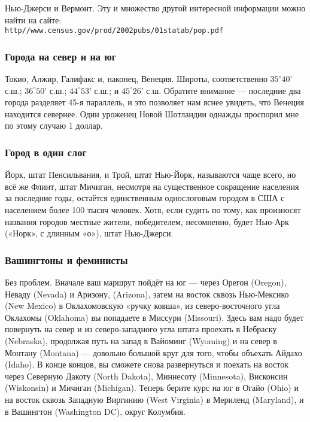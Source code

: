 Нью-Джерси и Вермонт.
Эту и множество другой интересной информации можно найти на сайте:\\
\texttt{http//www.census.gov/prod/2002pubs/01statab/pop.pdf} 
 \heart                          

\subsubsection*{Города на север и на юг}%

Токио, Алжир, Галифакс и, наконец, Венеция.
Широты, соответственно
$35^\circ 40’$ с.ш.; $36^\circ 50’$ с.ш.; $44^\circ 53’$ с.ш.; и $45^\circ 26’$ с.ш.
Обратите внимание --- последние два города разделяет 45-я параллель, и это позволяет нам яснее увидеть, что Венеция находится севернее.
Один уроженец Новой Шотландии однажды проспорил мне по этому случаю 1 доллар.%
\heart

\subsubsection*{Город в один слог}%

Йорк, штат Пенсильвания, и Трой, штат Нью-Йорк, называются чаще всего, но всё же Флинт, штат Мичиган, несмотря на существенное сокращение населения за последние годы, остаётся единственным однослоговым городом в США с населением более 100 тысяч человек.
Хотя, если судить по тому, как произносят названия городов местные жители, победителем, несомненно, будет Нью-Арк («Норк», с длинным «о»), штат Нью-Джерси.
\heart

\subsubsection*{Вашингтоны и феминисты} %

Без проблем.
Вначале ваш маршрут пойдёт на юг --- через Орегон (Oregon), 
Неваду (Nevada) 
и Аризону, (Arizona), 
затем на восток сквозь Нью-Мексико (New Mexico) 
в Оклахомовскую «ручку ковша», из северо-восточного угла Оклахомы (Oklahoma) 
вы попадаете в Миссури (Missouri).
Здесь вам надо будет повернуть на север и из северо-западного угла штата проехать в Небраску (Nebraska), продолжая путь на запад в Вайоминг (Wyoming) и на север в Монтану (Montana) --- довольно большой круг для того, чтобы объехать Айдахо (Idaho).
В конце концов, вы сможете снова развернуться и поехать на восток через Северную Дакоту (North Dakota), 
Миннесоту (Minnesota), 
Висконсин (Wiskonsin) 
и Мичиган (Michigan).
Теперь берите курс на юг в Огайо (Ohio) и на восток сквозь Западную Виргинию (West Virginia) в Мериленд (Maryland),
 и в Вашингтон (Washington DC), округ Колумбия.\heart

